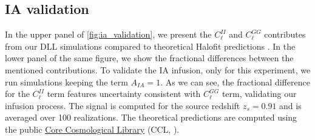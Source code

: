 \documentclass[twocolumn,twocolappendix]{aastex63}
\begin{document}
\subsection{IA validation}
In the upper panel of  \autoref{fig:ia_validation}, we present the $C_{\ell}^{II}$ and $C_{\ell}^{GG}$ contributes from our DLL simulations compared to theoretical Halofit predictions \citep{smith2003stable}. In the lower panel of the same figure, we show the fractional differences between the mentioned contributions.
To validate the IA infusion, only for this experiment, we run simulations keeping the term $A_{IA}=1$. 
As we can see, the fractional difference for the $C_{\ell}^{II}$ term features uncertainty consistent with $C_{\ell}^{GG}$ term, validating our infusion process. 
The signal is computed for the source redshift $z_s=0.91$ and is averaged over 100 realizations.
 The theoretical predictions are computed using the public \href{https://ccl.readthedocs.io/en/latest/}{Core Cosmological Library} (CCL, \citet{chisari2019core}). 
\end{document}
